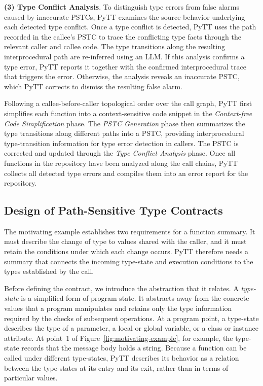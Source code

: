 \textbf{(3) Type Conflict Analysis}.
To distinguish type errors from false alarms caused by inaccurate PSTCs, 
PyTT examines the source behavior underlying each detected type conflict.
Once a type conflict is detected, PyTT uses the path recorded in the callee's PSTC 
to trace the conflicting type facts through the relevant caller and callee code.
The type transitions along the resulting interprocedural path are re-inferred using an LLM.
If this analysis confirms a type error, PyTT reports it together with the confirmed interprocedural trace that triggers the error.
Otherwise, the analysis reveals an inaccurate PSTC, which PyTT corrects to dismiss the resulting false alarm.

Following a callee-before-caller topological order over the call graph, 
PyTT first simplifies each function into a context-sensitive code 
snippet in the \textit{Context-free Code Simplification} phase.
The \textit{PSTC Generation} phase then summarizes the type 
transitions along different paths into a PSTC, 
providing interprocedural type-transition information for type error detection in callers.
The PSTC is corrected and updated through the \textit{Type Conflict Analysis} phase.
Once all functions in the repository have been analyzed along the call chains, 
PyTT collects all detected type errors and compiles them into an error report for the repository.

\subsection{Design of Path-Sensitive Type Contracts}
\label{sec:state-model}


The motivating example establishes two requirements for a function
summary. It must describe the change of type to values shared with the caller, and
it must retain the conditions under which each change occurs. 
PyTT therefore needs a summary that connects the incoming type-state and
execution conditions to the types established by the call.

Before defining the contract, we introduce the abstraction that it
relates. 
A \emph{type-state} is a simplified form of program state. It
abstracts away from the concrete values that a program manipulates and
retains only the type information required by the checks of subsequent
operations. At a program point, a type-state describes the type of a
parameter, a local or global variable, or a class or instance attribute.
At point~1 of Figure~\ref{fig:motivating-example}, for example, the
type-state records that the message body holds a string. Because a
function can be called under different type-states, PyTT describes its
behavior as a relation between the type-states at its entry and its exit,
rather than in terms of particular values.


